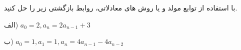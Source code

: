 \exercise
با استفاده از توابع مولد و یا روش های معادلاتی، روابط بازگشتی زیر را حل کنید.

الف)
$a_0 = 2, a_n = 2a_{n-1} + 3$

ب)
$a_0 = 1, a_1 = 1, a_n = 4a_{n-1} - 4a_{n-2}$
